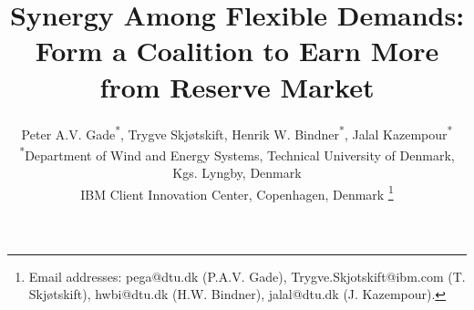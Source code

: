 \documentclass[lettersize,journal]{IEEEtran}
\begin{document}
\title{Synergy Among Flexible Demands: Form a Coalition to Earn More from Reserve Market}

\author{Peter A.V. Gade\textsuperscript{*}\textsuperscript{\textdagger}, Trygve Skjøtskift\textsuperscript{\textdagger}, Henrik W. Bindner\textsuperscript{*}, Jalal Kazempour\textsuperscript{*} \\
    \textsuperscript{*}Department of Wind and Energy Systems, Technical University of Denmark, Kgs. Lyngby, Denmark \\
    \textsuperscript{\textdagger}IBM Client Innovation Center, Copenhagen, Denmark
    \thanks{
        Email addresses: pega@dtu.dk (P.A.V. Gade), Trygve.Skjotskift@ibm.com (T. Skjøtskift), hwbi@dtu.dk (H.W. Bindner), jalal@dtu.dk (J. Kazempour).}%

    \vspace{-8mm}
}




\maketitle

\end{document}
